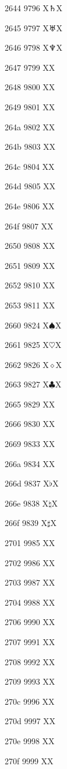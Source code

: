 \documentclass[11pt]{article}
\begin{document}
2644 9796 X{\ensuremath{\saturn}}X

2645 9797 X{\ensuremath{\uranus}}X

2646 9798 X{\ensuremath{\neptune}}X

2647 9799 X{\pluto}X

2648 9800 X{\aries}X

2649 9801 X{\taurus}X

264a 9802 X{\gemini}X

264b 9803 X{\cancer}X

264c 9804 X{\leo}X

264d 9805 X{\virgo}X

264e 9806 X{\libra}X

264f 9807 X{\scorpio}X

2650 9808 X{\sagittarius}X

2651 9809 X{\capricornus}X

2652 9810 X{\aquarius}X

2653 9811 X{\pisces}X

2660 9824 X{\ensuremath{\spadesuit}}X

2661 9825 X{\ensuremath{\heartsuit}}X

2662 9826 X{\ensuremath{\diamond}}X

2663 9827 X{\ensuremath{\clubsuit}}X

2665 9829 X{}X

2666 9830 X{}X

2669 9833 X{\quarternote}X

266a 9834 X{\eighthnote}X

266d 9837 X{\ensuremath{\flat}}X

266e 9838 X{\ensuremath{\natural}}X

266f 9839 X{\ensuremath{\sharp}}X

2701 9985 X{}X

2702 9986 X{}X

2703 9987 X{}X

2704 9988 X{}X

2706 9990 X{}X

2707 9991 X{}X

2708 9992 X{}X

2709 9993 X{}X

270c 9996 X{}X

270d 9997 X{}X

270e 9998 X{}X

270f 9999 X{}X
\end{document}
